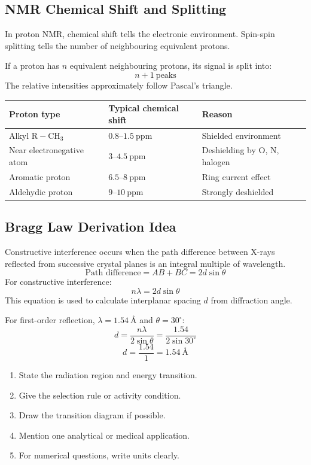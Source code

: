 \documentclass[12pt,a4paper]{article}
\begin{document}
\subsection{NMR Chemical Shift and Splitting}
In proton NMR, chemical shift tells the electronic environment. Spin-spin splitting tells the number of neighbouring equivalent protons.

\begin{tcolorbox}[formulabox, title={NMR Splitting Rule}]
If a proton has $n$ equivalent neighbouring protons, its signal is split into:
\[
n+1\ \text{peaks}
\]
The relative intensities approximately follow Pascal's triangle.
\end{tcolorbox}

\begin{tabularx}{\linewidth}{|B{3.0cm}|Y|Y|}
\hline
\textbf{Proton type} & \textbf{Typical chemical shift} & \textbf{Reason} \\
\hline
Alkyl $\mathrm{R-CH_3}$ & $0.8$--$1.5\ \mathrm{ppm}$ & Shielded environment \\
\hline
Near electronegative atom & $3$--$4.5\ \mathrm{ppm}$ & Deshielding by O, N, halogen \\
\hline
Aromatic proton & $6.5$--$8\ \mathrm{ppm}$ & Ring current effect \\
\hline
Aldehydic proton & $9$--$10\ \mathrm{ppm}$ & Strongly deshielded \\
\hline
\end{tabularx}

\subsection{Bragg Law Derivation Idea}
Constructive interference occurs when the path difference between X-rays reflected from successive crystal planes is an integral multiple of wavelength.
\[
\text{Path difference}=AB+BC=2d\sin\theta
\]
For constructive interference:
\[
n\lambda=2d\sin\theta
\]
This equation is used to calculate interplanar spacing $d$ from diffraction angle.

\begin{tcolorbox}[examplebox, title={Solved Example: Crystal Plane Spacing}]
For first-order reflection, $\lambda=1.54\ \text{\AA}$ and $\theta=30^\circ$:
\[
d=\frac{n\lambda}{2\sin\theta}=\frac{1.54}{2\sin30^\circ}
\]
\[
d=\frac{1.54}{1}=1.54\ \text{\AA}
\]
\end{tcolorbox}

\begin{tcolorbox}[masonbox, title={Answer-Writing Pattern for Spectroscopy}]
\begin{enumerate}[leftmargin=*, itemsep=3pt, topsep=2pt]
  \item State the radiation region and energy transition.
  \item Give the selection rule or activity condition.
  \item Draw the transition diagram if possible.
  \item Mention one analytical or medical application.
  \item For numerical questions, write units clearly.
\end{enumerate}
\end{tcolorbox}
\end{document}

